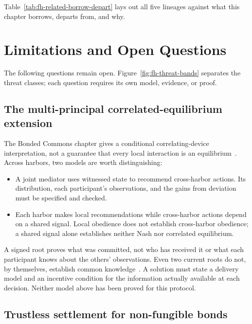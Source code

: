 \documentclass[11pt,a4paper]{article}
\theoremstyle{definition}
\theoremstyle{remark}
\begin{document}
Table~\ref{tab:fh-related-borrow-depart} lays out all five lineages against what this chapter borrows, departs from, and why.



\section{Limitations and Open Questions}\label{sec:fh-limitations}

The following questions remain open. Figure~\ref{fig:fh-threat-bands} separates the threat classes; each question requires its own model, evidence, or proof.

\subsection{The multi-principal correlated-equilibrium extension}\label{sec:fh-lim-correlated}

The Bonded Commons chapter gives a conditional correlating-device interpretation, not a guarantee that every local interaction is an equilibrium~. Across harbors, two models are worth distinguishing:

\begin{itemize}[nosep]
\item A joint mediator uses witnessed state to recommend cross-harbor actions. Its distribution, each participant's observations, and the gains from deviation must be specified and checked.
\item Each harbor makes local recommendations while cross-harbor actions depend on a shared signal. Local obedience does not establish cross-harbor obedience; a shared signal alone establishes neither Nash nor correlated equilibrium.
\end{itemize}

A signed root proves what was committed, not who has received it or what each participant knows about the others' observations. Even two current roots do not, by themselves, establish common knowledge~. A solution must state a delivery model and an incentive condition for the information actually available at each decision. Neither model above has been proved for this protocol.

\subsection{Trustless settlement for non-fungible bonds}\label{sec:fh-lim-trustless}
\end{document}
